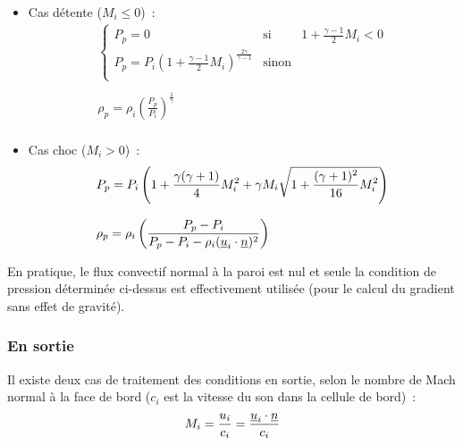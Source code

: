 \begin{enumerate}
\begin{itemize}
\item Cas d\'etente ($M_i \leqslant 0$)~:\\
$$
\begin{array}{l}
\left\{\begin{array}{lll}
P_p=0 & \text{si} & 1 + \displaystyle\frac{\gamma-1}{2}M_i<0\\
P_p = P_i \left(1 + \displaystyle\frac{\gamma-1}{2}M_i\right)
^{\frac{2\gamma}{\gamma-1}} & \text{sinon}\\
\end{array}\right.\\
\\
\rho_p=\rho_i \left(\displaystyle\frac{P_p}{P_i}\right)^{\frac{1}{\gamma}}\\
\end{array}
$$

\item Cas choc ($M_i > 0$)~:\\
$$
\begin{array}{l}
P_p = P_i \left(1 + \displaystyle\frac{\gamma(\gamma+1)}{4}M_i^2
+\gamma M_i \displaystyle\sqrt{1+\displaystyle\frac{(\gamma+1)^2}{16}M_i^2}\right)
\\
\\
\rho_p=\rho_i \left(\displaystyle\frac{P_p-P_i}
{P_p-P_i-\rho_i (\underline{u}_i \cdot \underline{n})^2}\right)\\
\end{array}
$$

\end{itemize}

\end{enumerate}

En pratique, le flux convectif normal \`a la paroi est nul et seule
la condition de pression d\'etermin\'ee ci-dessus est effectivement
utilis\'ee (pour le calcul du gradient sans effet de gravit\'e).

\subsubsection*{En sortie}

Il existe deux cas de traitement des conditions en sortie,
selon le nombre de Mach normal \`a la face de bord
($c_i$ est la vitesse du son dans la cellule de bord)~:
$$M_i = \displaystyle\frac{u_i}{c_i}
= \displaystyle\frac{\underline{u}_i \cdot \underline{n}}{c_i}$$

